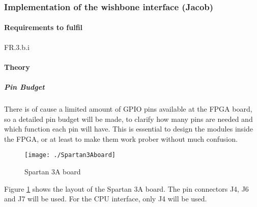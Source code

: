 \subsubsection{Implementation of the wishbone interface (Jacob)} 
\paragraph{Requirements to fulfil}
FR.3.b.i
\paragraph{Theory}\mbox{}
\subparagraph{Pin Budget}
There is of cause a limited amount of GPIO pins available at the FPGA board, so a detailed pin budget will be made, to clarify how many pins are needed and which function each pin will have. This is essential to design the modules inside the FPGA, or at least to make them work prober without much confusion.


\begin{figure}[H]
\centering
\texttt{[image: ./Spartan3Aboard]}
\caption{Spartan 3A board}
\label{fig:Spartan3Aboard}
\end{figure}




Figure \ref{fig:Spartan3Aboard} shows the layout of the Spartan 3A board. The pin connectors J4, J6 and J7 will be used. For the CPU interface, only J4 will be used. 

